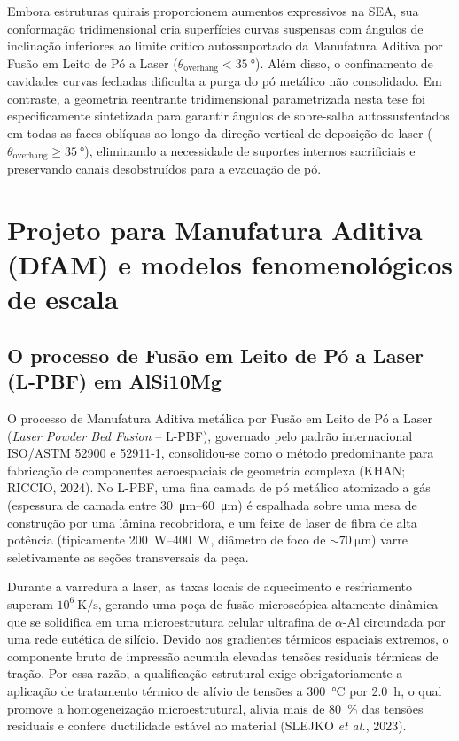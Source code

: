 Embora estruturas quirais proporcionem aumentos expressivos na SEA, sua conformação tridimensional cria superfícies curvas suspensas com ângulos de inclinação inferiores ao limite crítico autossuportado da Manufatura Aditiva por Fusão em Leito de Pó a Laser ($\theta_{\text{overhang}} < \SI{35}{\degree}$). Além disso, o confinamento de cavidades curvas fechadas dificulta a purga do pó metálico não consolidado. Em contraste, a geometria reentrante tridimensional parametrizada nesta tese foi especificamente sintetizada para garantir ângulos de sobre-salha autossustentados em todas as faces oblíquas ao longo da direção vertical de deposição do laser ($\theta_{\text{overhang}} \ge \SI{35}{\degree}$), eliminando a necessidade de suportes internos sacrificiais e preservando canais desobstruídos para a evacuação de pó.

\section{Projeto para Manufatura Aditiva (DfAM) e modelos fenomenológicos de escala}
\label{sec:dfam-escala}

\subsection{O processo de Fusão em Leito de Pó a Laser (L-PBF) em AlSi10Mg}
\label{subsec:lpbf-teoria}

O processo de Manufatura Aditiva metálica por Fusão em Leito de Pó a Laser (\textit{Laser Powder Bed Fusion} -- L-PBF), governado pelo padrão internacional ISO/ASTM 52900 e 52911-1, consolidou-se como o método predominante para fabricação de componentes aeroespaciais de geometria complexa (KHAN; RICCIO, 2024). No L-PBF, uma fina camada de pó metálico atomizado a gás (espessura de camada entre \SIrange{30}{60}{\micro\metre}) é espalhada sobre uma mesa de construção por uma lâmina recobridora, e um feixe de laser de fibra de alta potência (tipicamente \SIrange{200}{400}{\watt}, diâmetro de foco de $\sim\SI{70}{\micro\metre}$) varre seletivamente as seções transversais da peça.

Durante a varredura a laser, as taxas locais de aquecimento e resfriamento superam $10^6\ \text{K/s}$, gerando uma poça de fusão microscópica altamente dinâmica que se solidifica em uma microestrutura celular ultrafina de $\alpha$-Al circundada por uma rede eutética de silício. Devido aos gradientes térmicos espaciais extremos, o componente bruto de impressão acumula elevadas tensões residuais térmicas de tração. Por essa razão, a qualificação estrutural exige obrigatoriamente a aplicação de tratamento térmico de alívio de tensões a \SI{300}{\celsius} por \SI{2.0}{\hour}, o qual promove a homogeneização microestrutural, alivia mais de \SI{80}{\percent} das tensões residuais e confere ductilidade estável ao material (SLEJKO \textit{et al.}, 2023).

